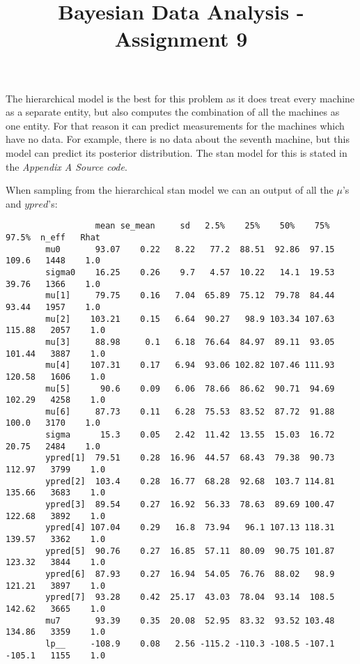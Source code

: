 \documentclass[11pt,a4paper,english]{article}
\title{Bayesian Data Analysis - Assignment 9}
\author{}
\begin{document}
        \maketitle

      The hierarchical model is the best for this problem as it does treat every machine as a separate entity, but also computes the combination of all the machines as one entity. For that reason it can predict measurements for the machines which have no data. For example, there is no data about the seventh machine, but this model can predict its posterior distribution. The stan model for this is stated in the \textit{Appendix A Source code}.

      When sampling from the hierarchical stan model we can an output of all the $\mu$'s and $ypred$'s:
      \begin{verbatim}
                  mean se_mean     sd   2.5%    25%    50%    75%  97.5%  n_eff   Rhat
        mu0       93.07    0.22   8.22   77.2  88.51  92.86  97.15  109.6   1448    1.0
        sigma0    16.25    0.26    9.7   4.57  10.22   14.1  19.53  39.76   1366    1.0
        mu[1]     79.75    0.16   7.04  65.89  75.12  79.78  84.44  93.44   1957    1.0
        mu[2]    103.21    0.15   6.64  90.27   98.9 103.34 107.63 115.88   2057    1.0
        mu[3]     88.98     0.1   6.18  76.64  84.97  89.11  93.05 101.44   3887    1.0
        mu[4]    107.31    0.17   6.94  93.06 102.82 107.46 111.93 120.58   1606    1.0
        mu[5]      90.6    0.09   6.06  78.66  86.62  90.71  94.69 102.29   4258    1.0
        mu[6]     87.73    0.11   6.28  75.53  83.52  87.72  91.88  100.0   3170    1.0
        sigma      15.3    0.05   2.42  11.42  13.55  15.03  16.72  20.75   2484    1.0
        ypred[1]  79.51    0.28  16.96  44.57  68.43  79.38  90.73 112.97   3799    1.0
        ypred[2]  103.4    0.28  16.77  68.28  92.68  103.7 114.81 135.66   3683    1.0
        ypred[3]  89.54    0.27  16.92  56.33  78.63  89.69 100.47 122.68   3892    1.0
        ypred[4] 107.04    0.29   16.8  73.94   96.1 107.13 118.31 139.57   3362    1.0
        ypred[5]  90.76    0.27  16.85  57.11  80.09  90.75 101.87 123.32   3844    1.0
        ypred[6]  87.93    0.27  16.94  54.05  76.76  88.02   98.9 121.21   3897    1.0
        ypred[7]  93.28    0.42  25.17  43.03  78.04  93.14  108.5 142.62   3665    1.0
        mu7       93.39    0.35  20.08  52.95  83.32  93.52 103.48 134.86   3359    1.0
        lp__     -108.9    0.08   2.56 -115.2 -110.3 -108.5 -107.1 -105.1   1155    1.0
      \end{verbatim}
\end{document}

